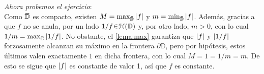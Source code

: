 \begin{sol}
\emph{Ahora probemos el ejercicio}:\\
Como $\ubar{\mathbb{D}}$ es compacto, existen $M = \max_{\ubar{\mathbb{D}}} \abs{f}$ y $m =\min_{\ubar{\mathbb{D}}} \abs{f}$. Además, gracias a que $f$ no se anula, por un lado $1/f \en \mathcal{H}({\mathbb{D}})$ y, por otro lado, $m > 0$, con lo cual $1/m = \max_{\ubar{\mathbb{D}}} \abs{1/f}$. No obstante, el \cref{lema:max} garantiza que $\abs{f}$ y $\abs{1/f}$ forzosamente alcanzan su máximo en la frontera $\partial\mathbb{D}$, pero por hipótesis, estos últimos valen exactamente $1$ en dicha frontera, con lo cual $M = 1 = 1/m = m$. De esto se sigue que $\abs{f}$ es constante de valor 1, así que $f$ es constante.
\end{sol}